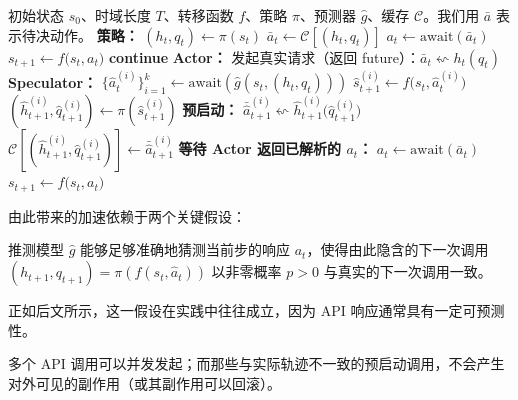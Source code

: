 \begin{algorithm}
\caption{具有 $k$ 路并行下一步调用的推测动作}
\label{alg:speculative-k}
\begin{algorithmic}[1]
\Require 初始状态 $s_0$、时域长度 $T$、转移函数 $f$、策略 $\pi$、预测器 $\hat g$、缓存 $\mathcal{C}$。我们用 $\bar{a}$ 表示待决动作。
    \State \textbf{策略：} $(h_t,q_t) \gets \pi(s_t)$
     
        \State $\bar{a}_t \gets \mathcal{C}[(h_t,q_t)]$
        \State $a_t \gets \text{await}(\bar{a}_t)$
        \State $s_{t+1} \gets f\big(s_t,a_t\big)$
        \State \textbf{continue}
    \EndIf
    \State \textbf{Actor：} 发起真实请求（返回 future）：$\bar{a}_t \leftsquigarrow h_t(q_t)$
    \State \textbf{Speculator：}
    $ \{\hat{a}_t^{(i)}\}_{i=1}^k \gets \text{await}(\hat g(s_t,(h_t,q_t)))$
     
        \State $\hat s_{t+1}^{(i)} \gets f\big(s_t, \hat a_t^{(i)}\big)$
        \State $(\hat{h}_{t+1}^{(i)},\hat{q}_{t+1}^{(i)}) \gets \pi(\hat s_{t+1}^{(i)})$
        \State \textbf{预启动：} $\bar{\hat{a}}_{t+1}^{(i)} \leftsquigarrow \hat{h}_{t+1}^{(i)}\!\big(\hat{q}_{t+1}^{(i)}\big)$
        \State \hspace{58pt} $\mathcal{C}[(\hat{h}_{t+1}^{(i)},\hat{q}_{t+1}^{(i)})] \gets \bar{\hat{a}}_{t+1}^{(i)}$
    \EndFor
    \State \textbf{等待 Actor 返回已解析的 $a_t$：} $a_t\gets \text{await}(\bar{a}_t)$
    \State $s_{t+1} \gets f\big(s_t,a_t\big)$
\EndFor
\end{algorithmic}
\end{algorithm}

由此带来的加速依赖于两个关键假设：

\begin{assumption}[推测准确性]\label{assum:guessing-accuracy}
推测模型 $\hat g$ 能够足够准确地猜测当前步的响应 $a_t$，使得由此隐含的下一次调用 $(h_{t+1},q_{t+1})=\pi(f(s_t,\hat a_t))$ 以非零概率 $p>0$ 与真实的下一次调用一致。
\end{assumption}

正如后文所示，这一假设在实践中往往成立，因为 API 响应通常具有一定可预测性。

\begin{assumption}[并发、可逆的预启动]\label{assum:concurent-API}
多个 API 调用可以并发发起；而那些与实际轨迹不一致的预启动调用，不会产生对外可见的副作用（或其副作用可以回滚）。
\end{assumption}

